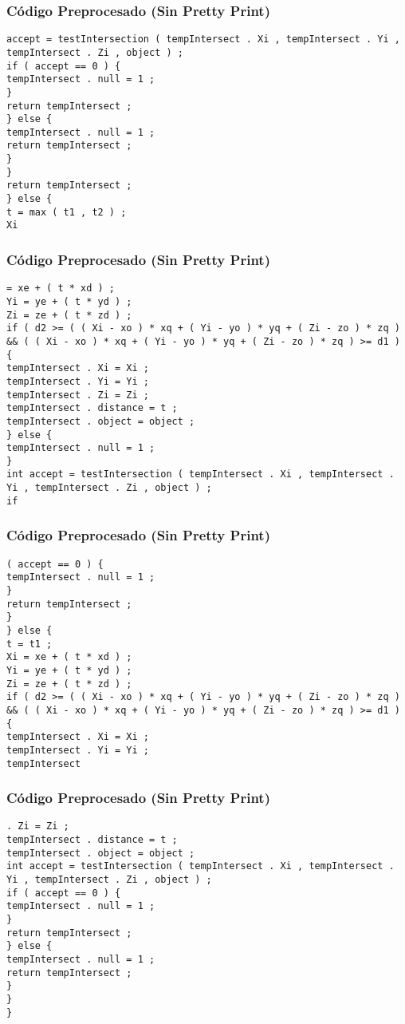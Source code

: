 \documentclass{beamer}
\begin{document}
\begin{frame}[fragile]
\frametitle{C\'odigo Preprocesado (Sin Pretty Print)}
\begin{lstlisting}[style=CStyle]
accept = testIntersection ( tempIntersect . Xi , tempIntersect . Yi , tempIntersect . Zi , object ) ; 
if ( accept == 0 ) { 
tempIntersect . null = 1 ; 
} 
return tempIntersect ; 
} else { 
tempIntersect . null = 1 ; 
return tempIntersect ; 
} 
} 
return tempIntersect ; 
} else { 
t = max ( t1 , t2 ) ; 
Xi \end{lstlisting}
\end{frame}
\begin{frame}[fragile]
\frametitle{C\'odigo Preprocesado (Sin Pretty Print)}
\begin{lstlisting}[style=CStyle]
= xe + ( t * xd ) ; 
Yi = ye + ( t * yd ) ; 
Zi = ze + ( t * zd ) ; 
if ( d2 >= ( ( Xi - xo ) * xq + ( Yi - yo ) * yq + ( Zi - zo ) * zq ) && ( ( Xi - xo ) * xq + ( Yi - yo ) * yq + ( Zi - zo ) * zq ) >= d1 ) { 
tempIntersect . Xi = Xi ; 
tempIntersect . Yi = Yi ; 
tempIntersect . Zi = Zi ; 
tempIntersect . distance = t ; 
tempIntersect . object = object ; 
} else { 
tempIntersect . null = 1 ; 
} 
int accept = testIntersection ( tempIntersect . Xi , tempIntersect . Yi , tempIntersect . Zi , object ) ; 
if \end{lstlisting}
\end{frame}
\begin{frame}[fragile]
\frametitle{C\'odigo Preprocesado (Sin Pretty Print)}
\begin{lstlisting}[style=CStyle]
( accept == 0 ) { 
tempIntersect . null = 1 ; 
} 
return tempIntersect ; 
} 
} else { 
t = t1 ; 
Xi = xe + ( t * xd ) ; 
Yi = ye + ( t * yd ) ; 
Zi = ze + ( t * zd ) ; 
if ( d2 >= ( ( Xi - xo ) * xq + ( Yi - yo ) * yq + ( Zi - zo ) * zq ) && ( ( Xi - xo ) * xq + ( Yi - yo ) * yq + ( Zi - zo ) * zq ) >= d1 ) { 
tempIntersect . Xi = Xi ; 
tempIntersect . Yi = Yi ; 
tempIntersect \end{lstlisting}
\end{frame}
\begin{frame}[fragile]
\frametitle{C\'odigo Preprocesado (Sin Pretty Print)}
\begin{lstlisting}[style=CStyle]
. Zi = Zi ; 
tempIntersect . distance = t ; 
tempIntersect . object = object ; 
int accept = testIntersection ( tempIntersect . Xi , tempIntersect . Yi , tempIntersect . Zi , object ) ; 
if ( accept == 0 ) { 
tempIntersect . null = 1 ; 
} 
return tempIntersect ; 
} else { 
tempIntersect . null = 1 ; 
return tempIntersect ; 
} 
} 
} \end{lstlisting}
\end{frame}
\end{document}
